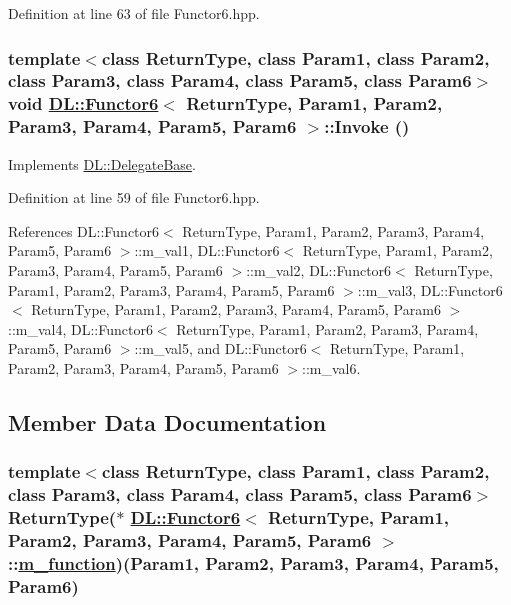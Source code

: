 Definition at line 63 of file Functor6.hpp.\hypertarget{classDL_1_1Functor6_a2}{
\subsubsection[Invoke]{\setlength{\rightskip}{0pt plus 5cm}template$<$class Return\-Type, class Param1, class Param2, class Param3, class Param4, class Param5, class Param6$>$ void \hyperlink{classDL_1_1Functor6}{DL::Functor6}$<$ Return\-Type, Param1, Param2, Param3, Param4, Param5, Param6 $>$::Invoke ()}}
\label{classDL_1_1Functor6_a2}




Implements \hyperlink{classDL_1_1DelegateBase_a2}{DL::Delegate\-Base}.

Definition at line 59 of file Functor6.hpp.

References DL::Functor6$<$ Return\-Type, Param1, Param2, Param3, Param4, Param5, Param6 $>$::m\_\-val1, DL::Functor6$<$ Return\-Type, Param1, Param2, Param3, Param4, Param5, Param6 $>$::m\_\-val2, DL::Functor6$<$ Return\-Type, Param1, Param2, Param3, Param4, Param5, Param6 $>$::m\_\-val3, DL::Functor6$<$ Return\-Type, Param1, Param2, Param3, Param4, Param5, Param6 $>$::m\_\-val4, DL::Functor6$<$ Return\-Type, Param1, Param2, Param3, Param4, Param5, Param6 $>$::m\_\-val5, and DL::Functor6$<$ Return\-Type, Param1, Param2, Param3, Param4, Param5, Param6 $>$::m\_\-val6.

\subsection{Member Data Documentation}
\hypertarget{classDL_1_1Functor6_r0}{
\subsubsection[m\_\-function]{\setlength{\rightskip}{0pt plus 5cm}template$<$class Return\-Type, class Param1, class Param2, class Param3, class Param4, class Param5, class Param6$>$ Return\-Type($\ast$ \hyperlink{classDL_1_1Functor6}{DL::Functor6}$<$ Return\-Type, Param1, Param2, Param3, Param4, Param5, Param6 $>$::\hyperlink{classDL_1_1Functor6_r0}{m\_\-function})(Param1, Param2, Param3, Param4, Param5, Param6)}}
\label{classDL_1_1Functor6_r0}




